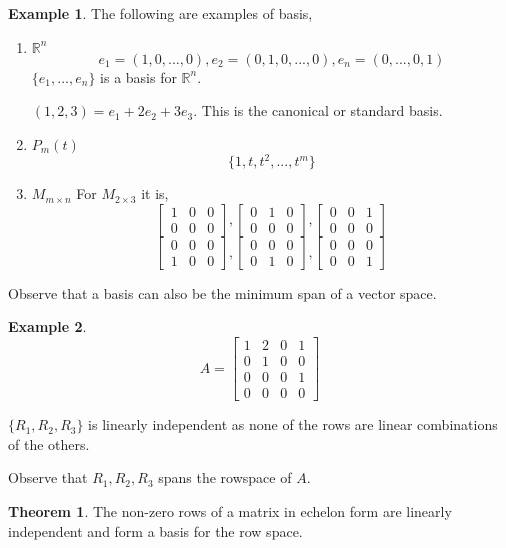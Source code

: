 \documentclass{report}
\theoremstyle{definition}
\newtheorem{_thm}{Theorem}[section]
\newtheorem{ex}{Example}[section]
\theoremstyle{remark}
\begin{document}
\begin{ex}
The following are examples of basis,
\begin{enumerate}[1)]
 \item $\mathbb{R}^n$
 \[e_1=(1,0,...,0), e_2=(0,1,0,...,0), e_n=(0,...,0,1)\]
 $\{e_1,...,e_n\}$ is a basis for $\mathbb{R}^n$.

 $(1,2,3)=e_1+2e_2+3e_3$. This is the canonical or standard basis.
 \item $P_m(t)$
 \[\{1,t,t^2,...,t^m\}\]
 \item $M_{m\times n}$
 For $M_{2\times 3}$ it is,
 \[
 \begin{bmatrix}
 1&0&0\\0&0&0
 \end{bmatrix},
 \begin{bmatrix}
 0&1&0\\0&0&0
 \end{bmatrix},
 \begin{bmatrix}
 0&0&1\\0&0&0
 \end{bmatrix}\]
 \[
 \begin{bmatrix}
 0&0&0\\1&0&0
 \end{bmatrix},
 \begin{bmatrix}
 0&0&0\\0&1&0
 \end{bmatrix},
 \begin{bmatrix}
 0&0&0\\0&0&1
 \end{bmatrix}\]
\end{enumerate}
\end{ex}

Observe that a basis can also be the minimum span of a vector space.

\begin{ex}
\[A=
\begin{bmatrix}
1 & 2 & 0 & 1 \\
0 & 1 & 0 & 0 \\
0 & 0 & 0 & 1 \\
0 & 0 & 0 & 0
\end{bmatrix}
\]

$\{R_1, R_2, R_3\}$ is linearly independent as none of the rows are linear combinations of the others.

Observe that $R_1, R_2, R_3$ spans the rowspace of $A$.
\end{ex}

\begin{_thm}
The non-zero rows of a matrix in echelon form are linearly independent and form a basis for the row space.
\end{_thm}
\end{document}
